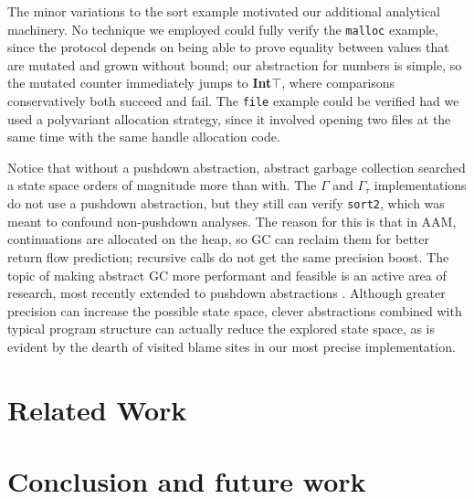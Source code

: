 The minor variations to the sort example motivated our additional analytical machinery.
%
No technique we employed could fully verify the {\tt malloc} example, since the protocol depends on being able to prove equality between values that are mutated and grown without bound; our abstraction for numbers is simple, so the mutated counter immediately jumps to \textbf{Int}$\top$, where comparisons conservatively both succeed and fail.
%
The {\tt file} example could be verified had we used a polyvariant allocation strategy, since it involved opening two files at the same time with the same handle allocation code.

Notice that without a pushdown abstraction, abstract garbage collection searched a state space orders of magnitude more than with.
%
The $\Gamma$ and $\Gamma_\tau$ implementations do not use a pushdown abstraction, but they still can verify {\tt sort2}, which was meant to confound non-pushdown analyses.
%
The reason for this is that in AAM, continuations are allocated on the heap, so GC can reclaim them for better return flow prediction; recursive calls do not get the same precision boost.
%
The topic of making abstract GC more performant and feasible is an active area of research, most recently extended to pushdown abstractions \citep{dvanhorn:Earl2012Introspective}.
%
Although greater precision can increase the possible state space, clever abstractions combined with typical program structure can actually reduce the explored state space, as is evident by the dearth of visited blame sites in our most precise implementation.

\section{Related Work}\label{sec:related}


\section{Conclusion and future work} \label{sec:conclusion}

